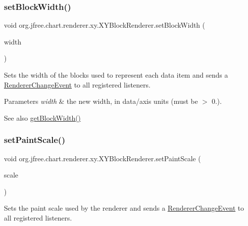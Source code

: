 \subsubsection{\texorpdfstring{set\+Block\+Width()}{setBlockWidth()}}
{\footnotesize\ttfamily void org.\+jfree.\+chart.\+renderer.\+xy.\+X\+Y\+Block\+Renderer.\+set\+Block\+Width (\begin{DoxyParamCaption}\item[{double}]{width }\end{DoxyParamCaption})}

Sets the width of the blocks used to represent each data item and sends a \mbox{\hyperlink{}{Renderer\+Change\+Event}} to all registered listeners.


\begin{DoxyParams}{Parameters}
{\em width} & the new width, in data/axis units (must be $>$ 0.).\\
\hline
\end{DoxyParams}
\begin{DoxySeeAlso}{See also}
\mbox{\hyperlink{classorg_1_1jfree_1_1chart_1_1renderer_1_1xy_1_1_x_y_block_renderer_acdc4373b03cf11a77d5ded9da046838a}{get\+Block\+Width()}} 
\end{DoxySeeAlso}
\mbox{\label{classorg_1_1jfree_1_1chart_1_1renderer_1_1xy_1_1_x_y_block_renderer_afd5b5bf65eeda72c806beab182dfbf07}} 
\subsubsection{\texorpdfstring{set\+Paint\+Scale()}{setPaintScale()}}
{\footnotesize\ttfamily void org.\+jfree.\+chart.\+renderer.\+xy.\+X\+Y\+Block\+Renderer.\+set\+Paint\+Scale (\begin{DoxyParamCaption}\item[{\mbox{\hyperlink{interfaceorg_1_1jfree_1_1chart_1_1renderer_1_1_paint_scale}{Paint\+Scale}}}]{scale }\end{DoxyParamCaption})}

Sets the paint scale used by the renderer and sends a \mbox{\hyperlink{}{Renderer\+Change\+Event}} to all registered listeners.


